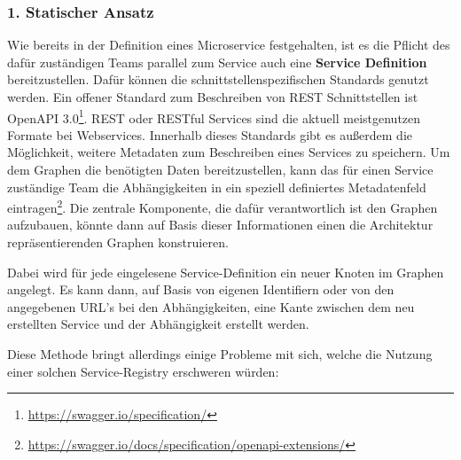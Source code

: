 \subsubsection*{1. Statischer Ansatz}
Wie bereits in der Definition eines Microservice festgehalten, ist es die Pflicht des dafür zuständigen Teams parallel zum Service auch eine \textbf{Service Definition} bereitzustellen. Dafür können die schnittstellenspezifischen Standards genutzt werden. Ein offener Standard zum Beschreiben von REST Schnittstellen ist OpenAPI 3.0\footnote{\url{https://swagger.io/specification/}}. REST oder RESTful Services sind die aktuell meistgenutzen Formate bei Webservices. Innerhalb dieses Standards gibt es außerdem die Möglichkeit, weitere Metadaten zum Beschreiben eines Services zu speichern. Um dem Graphen die benötigten Daten bereitzustellen, kann das für einen Service zuständige Team die Abhängigkeiten in ein speziell definiertes Metadatenfeld eintragen\footnote{\url{https://swagger.io/docs/specification/openapi-extensions/}}. Die zentrale Komponente, die dafür verantwortlich ist den Graphen aufzubauen, könnte dann auf Basis dieser Informationen einen die Architektur repräsentierenden Graphen konstruieren. 

Dabei wird für jede eingelesene Service-Definition ein neuer Knoten im Graphen angelegt. Es kann dann, auf Basis von eigenen Identifiern oder von den angegebenen URL's bei den Abhängigkeiten, eine Kante zwischen dem neu erstellten Service und der Abhängigkeit erstellt werden.

Diese Methode bringt allerdings einige Probleme mit sich, welche die Nutzung einer solchen Service-Registry erschweren würden:

